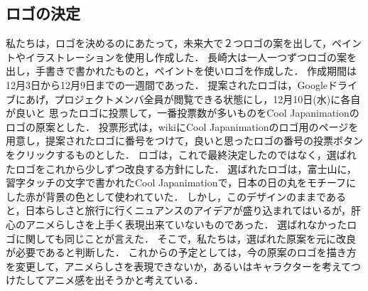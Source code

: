 \subsection{ロゴの決定}
\par
私たちは，ロゴを決めるのにあたって，未来大で２つロゴの案を出して，ペイントやイラストレーションを使用し作成した．
長崎大は一人一つずつロゴの案を出し，手書きで書かれたものと，ペイントを使いロゴを作成した．
作成期間は12月3日から12月9日までの一週間であった．
提案されたロゴは，Googleドライブにあげ，プロジェクトメンバ全員が閲覧できる状態にし，12月10日(水)に各自が良いと
思ったロゴに投票して，一番投票数が多いものをCool Japanimationのロゴの原案とした．
投票形式は，wikiにCool Japanimationのロゴ用のページを用意し，提案されたロゴに番号をつけて，良いと思ったロゴの番号の投票ボタンをクリックするものとした．
ロゴは，これで最終決定したのではなく，選ばれたロゴをこれから少しずつ改良する方針にした．
選ばれたロゴは，富士山に，習字タッチの文字で書かれたCool Japanimationで，日本の日の丸をモチーフにした赤が背景の色として使われていた．
しかし，このデザインのままであると，日本らしさと旅行に行くニュアンスのアイデアが盛り込まれてはいるが，肝心のアニメらしさを上手く表現出来ていないものであった．
選ばれなかったロゴに関しても同じことが言えた．
そこで，私たちは，選ばれた原案を元に改良が必要であると判断した．
これからの予定としては，今の原案のロゴを描き方を変更して，アニメらしさを表現できないか，あるいはキャラクターを考えてつけたしてアニメ感を出そうかと考えている．
